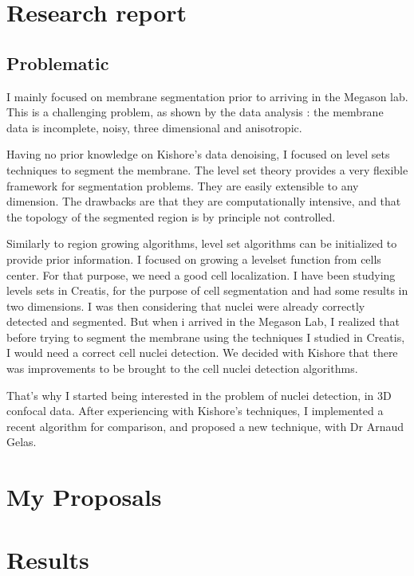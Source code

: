 

\chapter{Research report} 


\section{Problematic}


I mainly focused on membrane segmentation prior to arriving in the Megason lab. This is a challenging problem, as shown by the data analysis : the membrane data is incomplete, noisy, three dimensional and anisotropic.

Having no prior knowledge on Kishore's data denoising, I focused on level sets techniques to segment the membrane.
The level set theory provides a very flexible framework for segmentation problems. They are easily extensible to any dimension.
The drawbacks are that they are computationally intensive, and that the topology of the segmented region is by principle not controlled.

Similarly to region growing algorithms, level set algorithms can be initialized to provide prior information.
I focused on growing a levelset function from cells center. For that purpose, we need a good cell localization.
I have been studying levels sets in Creatis, for the purpose of cell segmentation and had some results in two dimensions.
I was then considering that nuclei were already correctly detected and segmented.
But when i arrived in the Megason Lab, I realized that before trying to segment the membrane using the techniques I studied in Creatis, I would need a correct cell nuclei detection.
We decided with Kishore that there was improvements to be brought to the cell nuclei detection algorithms.

That's why I started being interested in the problem of nuclei detection, in 3D confocal data.
After experiencing with Kishore's techniques, I implemented a recent algorithm for comparison, and proposed a new technique, with Dr Arnaud Gelas.


\chapter{My Proposals}
\chapter{Results}

